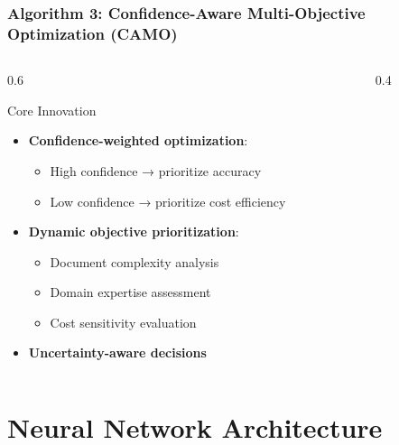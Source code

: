 \documentclass{beamer}
\begin{document}
\begin{frame}
\frametitle{Algorithm 3: Confidence-Aware Multi-Objective Optimization (CAMO)}
\begin{columns}
\begin{column}{0.6\textwidth}
\begin{block}{Core Innovation}
\begin{itemize}
\item \textbf{Confidence-weighted optimization}:
    \begin{itemize}
    \item High confidence → prioritize accuracy
    \item Low confidence → prioritize cost efficiency
    \end{itemize}
\item \textbf{Dynamic objective prioritization}:
    \begin{itemize}
    \item Document complexity analysis
    \item Domain expertise assessment
    \item Cost sensitivity evaluation
    \end{itemize}
\item \textbf{Uncertainty-aware decisions}
\end{itemize}
\end{block}
\end{column}
\begin{column}{0.4\textwidth}
\begin{center}
\end{center}
\end{column}
\end{columns}
\end{frame}

\section{Neural Network Architecture}
\end{document}

